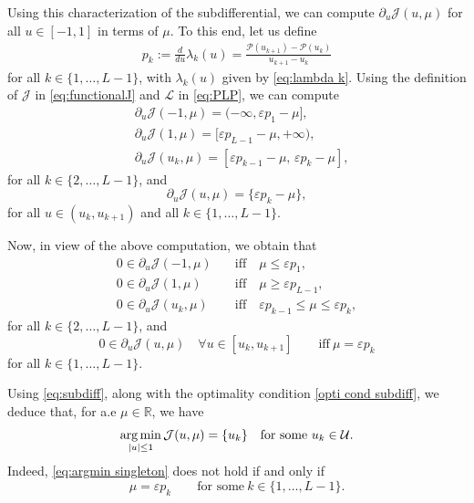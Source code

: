 \documentclass[twocolumn]{autart}    %
\begin{document}
Using this characterization of the subdifferential, we can compute $\partial_u\mathcal{J}(u,\mu)$ for all $u\in [-1,1]$ in terms of $\mu$. To this end, let us define
\begin{align*} 
	p_k := \frac{d}{du}\lambda_k(u) = \frac{\mathcal{P}(u_{k+1}) - \mathcal{P} (u_k) }{u_{k+1} - u_k} 
\end{align*} 
for all $k\in \{1, \ldots, L-1\}$, with $\lambda_k(u)$ given by \eqref{eq:lambda k}. Using the definition of $\mathcal{J}$ in \eqref{eq:functionalJ} and $\mathcal{L}$ in \eqref{eq:PLP}, we can compute
\begin{align*}
	&\partial_u \mathcal{J} (-1,\mu) = (-\infty, \varepsilon p_1 -\mu], 
	\\[5pt]
	&\partial_u \mathcal{J} (1,\mu) = [\varepsilon p_{L-1} -\mu, +\infty), 
	\\[5pt]
	&\partial_u \mathcal{J} (u_k,\mu) = [\varepsilon p_{k-1} -\mu,  \, \varepsilon p_k -\mu],
\end{align*}
for all $k\in \{ 2, \ldots, L-1\}$, and
\begin{equation*}
	\partial_u \mathcal{J}(u,\mu) = \{\varepsilon p_k -\mu\},
\end{equation*}
for all $u\in (u_k, u_{k+1})$ and all $k\in \{ 1, \ldots, L-1 \}$.

Now, in view of the above computation, we obtain that
\begin{equation}\label{eq:subdiff}
	\begin{array}{ll}
		0\in \partial_u \mathcal{J} (-1,\mu) & \quad\text{iff}\quad  \mu\leq  \varepsilon p_1, 
		\\[5pt]
		0\in \partial_u \mathcal{J} (1,\mu) & \quad\text{iff} \quad \mu\geq  \varepsilon p_{L-1}, 
		\\[5pt]
		0\in \partial_u \mathcal{J} (u_k,\mu) & \quad\text{iff} \quad  \varepsilon p_{k-1} \leq \mu \leq \varepsilon p_k , 
	\end{array} 
\end{equation}
for all $k\in \{ 2, \ldots, L-1\}$,  and
\begin{equation}\label{eq:subdiff2}
	0\in \partial_u \mathcal{J} (u,\mu) \quad \forall  u\in [u_k, u_{k+1}] \qquad \text{iff} \ \mu= \varepsilon p_k
\end{equation}
for all $k\in \{ 1, \ldots, L-1 \}$.

Using \eqref{eq:subdiff}, along with the optimality condition \eqref{opti cond subdiff}, we deduce that, 
for a.e $\mu\in \mathbb{R}$, we have
\begin{equation}\label{eq:argmin singleton}
\operatorname*{arg\,min}_{|u|\leq 1} \mathcal{J} (u,\mu) = \{u_k\} \quad \text{for some} \ u_k\in \mathcal{U}.
\end{equation}
Indeed,  \eqref{eq:argmin singleton} does not hold if and only if
\begin{equation}\label{eq:argmin non singleton}
\mu = \varepsilon p_k \qquad \text{for some}\ k\in \{1,\ldots, L-1\}.
\end{equation}
\end{document}
